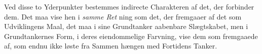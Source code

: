 Ved disse to Yderpunkter bestemmes indirecte Charakteren
af det, der forbinder dem. Det maa vise hen i \emph{samme Ret\-}%
ning som det, der fremgaaer af det som Udviklingens Maal,
det maa i sine Grundtanker aabenbare Slægtskabet, men i
Grundtankernes Form, i deres eiendommelige Farvning, vise
dem som fremgaaede af, som endnu ikke løste fra Sammen\-%
hængen med Fortidens Tanker.

